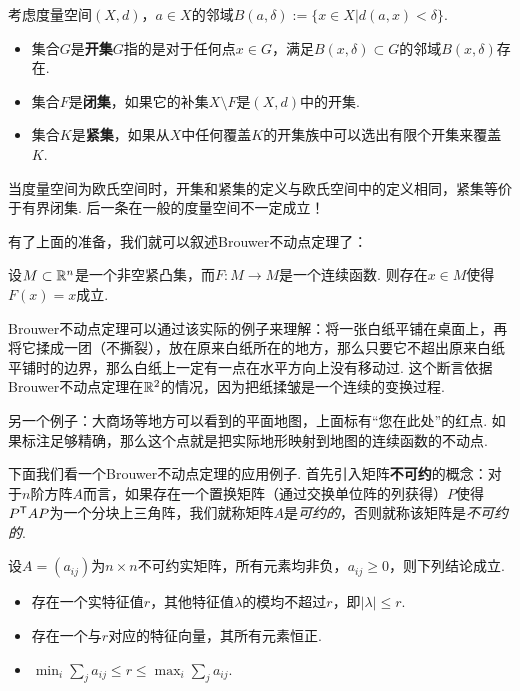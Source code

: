 \begin{definition}[开集、闭集和紧集]
    考虑度量空间$(X,d)$，$a\in X$的邻域$B(a,\delta):=\{x\in X|d(a,x)<\delta\}$.
\begin{itemize}
    \item 集合$G$是\textbf{开集}$G$指的是对于任何点$x\in G$，满足$B(x,\delta)\subset G$的邻域$B(x,\delta)$存在.
    \item 集合$F$是\textbf{闭集}，如果它的补集$X\setminus F$是$(X,d)$中的开集.
    \item 集合$K$是\textbf{紧集}，如果从$X$中任何覆盖$K$的开集族中可以选出有限个开集来覆盖$K$.
\end{itemize}
\end{definition}
当度量空间为欧氏空间时，开集和紧集的定义与欧氏空间中的定义相同，紧集等价于有界闭集. 后一条在一般的度量空间不一定成立！

有了上面的准备，我们就可以叙述Brouwer不动点定理了：

\begin{theorem}[Brouwer不动点定理]
    设$M\subset\mathbb{R}^n$是一个非空紧凸集，而$F:M\to M$是一个连续函数. 则存在$x\in M$使得$F(x)=x$成立.
\end{theorem}

Brouwer不动点定理可以通过该实际的例子来理解：将一张白纸平铺在桌面上，再将它揉成一团（不撕裂），放在原来白纸所在的地方，那么只要它不超出原来白纸平铺时的边界，那么白纸上一定有一点在水平方向上没有移动过. 这个断言依据Brouwer不动点定理在$\mathbb{R}^2$的情况，因为把纸揉皱是一个连续的变换过程.

另一个例子：大商场等地方可以看到的平面地图，上面标有“您在此处”的红点. 如果标注足够精确，那么这个点就是把实际地形映射到地图的连续函数的不动点.

下面我们看一个Brouwer不动点定理的应用例子. 首先引入矩阵\textbf{不可约}的概念：对于$n$阶方阵$A$而言，如果存在一个置换矩阵（通过交换单位阵的列获得）$P$使得$P^{\mathsf{T}} AP$为一个分块上三角阵，我们就称矩阵$A$是\emph{可约的}，否则就称该矩阵是\emph{不可约的}.

\begin{theorem}
    设$A=(a_{ij})$为$n\times n$不可约实矩阵，所有元素均非负，$a_{ij}\ge 0$，则下列结论成立.
    \begin{itemize}
        \item 存在一个实特征值$r$，其他特征值$\lambda$的模均不超过$r$，即$|\lambda|\le r$.
        \item 存在一个与$r$对应的特征向量，其所有元素恒正.
        \item $\min_i\sum_{j}a_{ij}\le r\le \max_i\sum_j a_{ij}$.
    \end{itemize}
\end{theorem}


